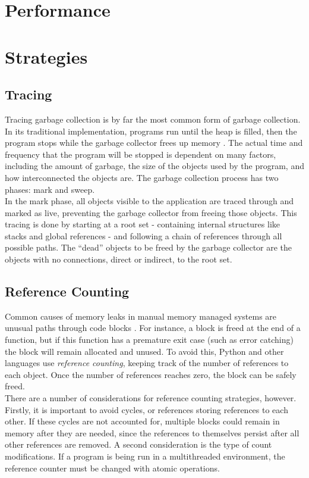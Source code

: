 \documentclass[12pt]{article}
\begin{document}
\section{Performance}

\section{Strategies}

\subsection{Tracing}
Tracing garbage collection is by far the most common form of garbage collection. In its traditional implementation, programs run until the heap is filled, then the program stops while the garbage collector frees up memory \cite{ibmJava}. The actual time and frequency that the program will be stopped is dependent on many factors, including the amount of garbage, the size of the objects used by the program, and how interconnected the objects are. The garbage collection process has two phases: mark and sweep.\\

In the mark phase, all objects visible to the application are traced through and marked as live, preventing the garbage collector from freeing those objects. This tracing is done by starting at a root set - containing internal structures like stacks and global references - and following a chain of references through all possible paths. The ``dead'' objects to be freed by the garbage collector are the objects with no connections, direct or indirect, to the root set.
\subsection{Reference Counting}
Common causes of memory leaks in manual memory managed systems are unusual paths through code blocks \cite{pythDocs}. For instance, a block is freed at the end of a function, but if this function has a premature exit case (such as error catching) the block will remain allocated and unused. To avoid this, Python and other languages use {\it reference counting}, keeping track of the number of references to each object. Once the number of references reaches zero, the block can be safely freed.\\

There are a number of considerations for reference counting strategies, however. Firstly, it is important to avoid cycles, or references storing references to each other. If these cycles are not accounted for, multiple blocks could remain in memory after they are needed, since the references to themselves persist after all other references are removed. A second consideration is the type of count modifications. If a program is being run in a multithreaded environment, the reference counter must be changed with atomic operations.
\end{document}
